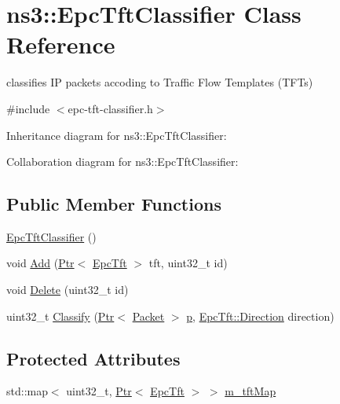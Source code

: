 \hypertarget{classns3_1_1EpcTftClassifier}{}\section{ns3\+:\+:Epc\+Tft\+Classifier Class Reference}
\label{classns3_1_1EpcTftClassifier}


classifies IP packets accoding to Traffic Flow Templates (T\+F\+Ts)  




{\ttfamily \#include $<$epc-\/tft-\/classifier.\+h$>$}



Inheritance diagram for ns3\+:\+:Epc\+Tft\+Classifier\+:


Collaboration diagram for ns3\+:\+:Epc\+Tft\+Classifier\+:
\subsection*{Public Member Functions}
\begin{DoxyCompactItemize}
\item 
\hyperlink{classns3_1_1EpcTftClassifier_a7ee3e50eceff5337e9a3baac1c51d686}{Epc\+Tft\+Classifier} ()
\item 
void \hyperlink{classns3_1_1EpcTftClassifier_a4a0dd2623dd9bfbfb806183625af74bd}{Add} (\hyperlink{classns3_1_1Ptr}{Ptr}$<$ \hyperlink{classns3_1_1EpcTft}{Epc\+Tft} $>$ tft, uint32\+\_\+t id)
\item 
void \hyperlink{classns3_1_1EpcTftClassifier_af09782a28deb918eba9b7b6fad37c05f}{Delete} (uint32\+\_\+t id)
\item 
uint32\+\_\+t \hyperlink{classns3_1_1EpcTftClassifier_a5db19944027854e4f6f1c7f2ec2ef336}{Classify} (\hyperlink{classns3_1_1Ptr}{Ptr}$<$ \hyperlink{classns3_1_1Packet}{Packet} $>$ \hyperlink{lte__link__budget__x2__handover__measures_8m_ac9de518908a968428863f829398a4e62}{p}, \hyperlink{classns3_1_1EpcTft_a6037510585658e017a8011862ce56946}{Epc\+Tft\+::\+Direction} direction)
\end{DoxyCompactItemize}
\subsection*{Protected Attributes}
\begin{DoxyCompactItemize}
\item 
std\+::map$<$ uint32\+\_\+t, \hyperlink{classns3_1_1Ptr}{Ptr}$<$ \hyperlink{classns3_1_1EpcTft}{Epc\+Tft} $>$ $>$ \hyperlink{classns3_1_1EpcTftClassifier_aa81c06fa8f3716646081c11e821b50e2}{m\+\_\+tft\+Map}
\end{DoxyCompactItemize}
